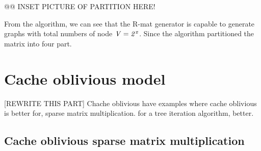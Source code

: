@@
INSET PICTURE OF PARTITION HERE!

From the algorithm, we can see that the R-mat generator is capable to generate graphs with total numbers of node $ \it{V} = 2^x$. Since the algorithm partitioned the matrix into four part. 

\section{Cache oblivious model} 
[REWRITE THIS PART]
Chache oblivious
have examples where cache oblivious is better for, sparse matrix multiplication.
for a tree iteration algorithm, better. 

\subsection{Cache oblivious sparse matrix multiplication}